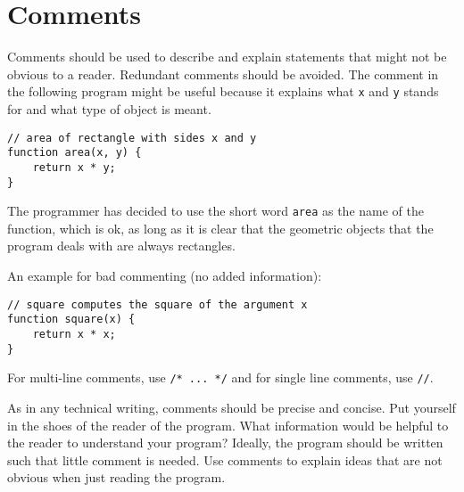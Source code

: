 \vspace{-4mm}

\section*{Comments}
Comments should be used to describe and explain statements 
that might not be obvious to a reader.
Redundant comments should be avoided. The comment in the following program might be
useful because it explains what \lstinline{x} and \lstinline{y} stands for and what type of
object is meant. 
\begin{lstlisting}
// area of rectangle with sides x and y
function area(x, y) {
    return x * y;
}
\end{lstlisting}
The programmer has decided to use the short word \lstinline{area} as the name of the function,
which is ok, as long as it is clear that the geometric objects that the program deals with
are always rectangles.

An example for bad commenting (no added information):
\begin{lstlisting}
// square computes the square of the argument x
function square(x) {
    return x * x;
}
\end{lstlisting}
%
For multi-line comments, use \lstinline{/* ... */} and for single line comments, use \lstinline{//}.

As in any technical writing, comments should be precise and concise. Put yourself in the
shoes of the reader of the program. What information would be helpful to the reader to
understand your program? Ideally, the program should be written such that little comment is
needed. Use comments to explain ideas that are not obvious when just reading the program.


      

